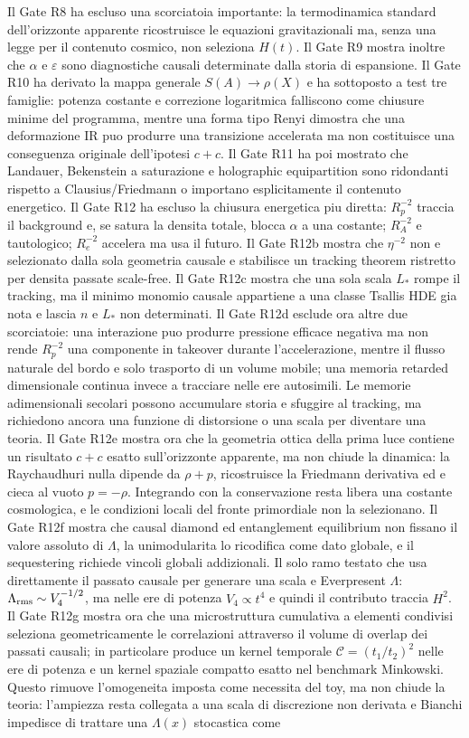\documentclass[11pt,a4paper]{article}
\begin{document}
Il Gate R8 ha escluso una scorciatoia importante: la termodinamica standard dell'orizzonte apparente ricostruisce le equazioni gravitazionali ma, senza una legge per il contenuto cosmico, non seleziona $H(t)$. Il Gate R9 mostra inoltre che $\alpha$ e $\varepsilon$ sono diagnostiche causali determinate dalla storia di espansione. Il Gate R10 ha derivato la mappa generale $S(A)\to\rho(X)$ e ha sottoposto a test tre famiglie: potenza costante e correzione logaritmica falliscono come chiusure minime del programma, mentre una forma tipo Renyi dimostra che una deformazione IR puo produrre una transizione accelerata ma non costituisce una conseguenza originale dell'ipotesi $c+c$. Il Gate R11 ha poi mostrato che Landauer, Bekenstein a saturazione e holographic equipartition sono ridondanti rispetto a Clausius/Friedmann o importano esplicitamente il contenuto energetico. Il Gate R12 ha escluso la chiusura energetica piu diretta: $R_p^{-2}$ traccia il background e, se satura la densita totale, blocca $\alpha$ a una costante; $R_A^{-2}$ e tautologico; $R_e^{-2}$ accelera ma usa il futuro. Il Gate R12b mostra che $\eta^{-2}$ non e selezionato dalla sola geometria causale e stabilisce un tracking theorem ristretto per densita passate scale-free. Il Gate R12c mostra che una sola scala $L_*$ rompe il tracking, ma il minimo monomio causale appartiene a una classe Tsallis HDE gia nota e lascia $n$ e $L_*$ non determinati. Il Gate R12d esclude ora altre due scorciatoie: una interazione puo produrre pressione efficace negativa ma non rende $R_p^{-2}$ una componente in takeover durante l'accelerazione, mentre il flusso naturale del bordo e solo trasporto di un volume mobile; una memoria retarded dimensionale continua invece a tracciare nelle ere autosimili. Le memorie adimensionali secolari possono accumulare storia e sfuggire al tracking, ma richiedono ancora una funzione di distorsione o una scala per diventare una teoria. Il Gate R12e mostra ora che la geometria ottica della prima luce contiene un risultato $c+c$ esatto sull'orizzonte apparente, ma non chiude la dinamica: la Raychaudhuri nulla dipende da $\rho+p$, ricostruisce la Friedmann derivativa ed e cieca al vuoto $p=-\rho$. Integrando con la conservazione resta libera una costante cosmologica, e le condizioni locali del fronte primordiale non la selezionano. Il Gate R12f mostra che causal diamond ed entanglement equilibrium non fissano il valore assoluto di $\Lambda$, la unimodularita lo ricodifica come dato globale, e il sequestering richiede vincoli globali addizionali. Il solo ramo testato che usa direttamente il passato causale per generare una scala e Everpresent $\Lambda$: $\Lambda_{\rm rms}\sim V_4^{-1/2}$, ma nelle ere di potenza $V_4\propto t^4$ e quindi il contributo traccia $H^2$. Il Gate R12g mostra ora che una microstruttura cumulativa a elementi condivisi seleziona geometricamente le correlazioni attraverso il volume di overlap dei passati causali; in particolare produce un kernel temporale $\mathcal C=(t_1/t_2)^2$ nelle ere di potenza e un kernel spaziale compatto esatto nel benchmark Minkowski. Questo rimuove l'omogeneita imposta come necessita del toy, ma non chiude la teoria: l'ampiezza resta collegata a una scala di discrezione non derivata e Bianchi impedisce di trattare una $\Lambda(x)$ stocastica come 
\end{document}
